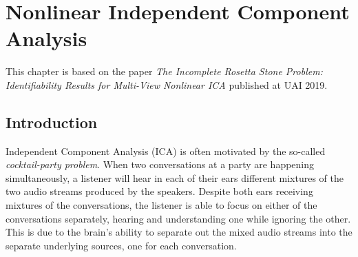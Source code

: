 \chapter{Nonlinear Independent Component Analysis}

\ifpdf
    \graphicspath{{Chapter4/Figs/Raster/}{Chapter4/Figs/PDF/}{Chapter4/Figs/}}
\else
    \graphicspath{{Chapter4/Figs/Vector/}{Chapter4/Figs/}}
\fi

This chapter is based on the paper \emph{The Incomplete Rosetta Stone Problem: Identifiability Results for Multi-View Nonlinear ICA} published at UAI 2019.


\section{Introduction}


Independent Component Analysis (ICA) is often motivated by the so-called \emph{cocktail-party problem}.
When two conversations at a party are happening simultaneously, a listener will hear in each of their ears different mixtures of the two audio streams produced by the speakers.
Despite both ears receiving mixtures of the conversations, the listener is able to focus on either of the conversations separately, hearing and understanding one while ignoring the other.
This is due to the brain's ability to separate out the mixed audio streams into the separate underlying sources, one for each conversation.

